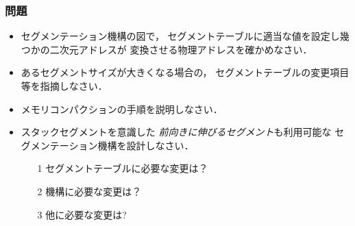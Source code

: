 \documentclass{beamer}                   %
\begin{document}
\begin{frame}
  \frametitle{問題}

  \begin{itemize}
    \item セグメンテーション機構の図で，
      セグメントテーブルに適当な値を設定し幾つかの二次元アドレスが
      変換させる物理アドレスを確かめなさい．
    \item あるセグメントサイズが大きくなる場合の，
      セグメントテーブルの変更項目等を指摘しなさい．
    \item メモリコンパクションの手順を説明しなさい．
    \item スタックセグメントを意識した
    \emph{前向きに伸びるセグメント}も利用可能な
    セグメンテーション機構を設計しなさい．
    \begin{enumerate}
    \item[1] セグメントテーブルに必要な変更は？
    \item[2] 機構に必要な変更は？
    \item[3] 他に必要な変更は?
    \end{enumerate}
  \end{itemize}
\end{frame}
\end{document}
